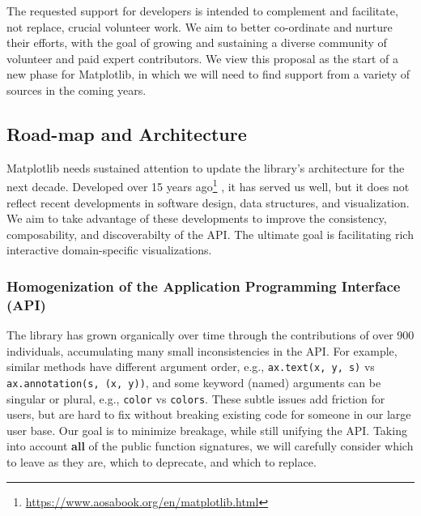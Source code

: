 \documentclass[11pt,letterpaper]{article}  %
\begin{document}
The requested support for developers is intended to complement and facilitate, not replace, crucial volunteer work. We aim to better co-ordinate and nurture their efforts, with the goal of growing and sustaining a diverse community of volunteer and paid expert contributors.
We view this proposal as the start of a new phase for Matplotlib, in which we will need to find support from a variety of sources in the coming years.



\subsection{Road-map and Architecture}
Matplotlib needs sustained attention to update the library's architecture for the next decade.
Developed over 15 years ago\footnote{\url{https://www.aosabook.org/en/matplotlib.html}} \cite{Hunter:2007}, it has served us well, but it does not reflect recent developments in software design, data structures, and visualization. We aim to take advantage of these developments to improve the consistency, composability, and discoverabilty of the API. The ultimate goal is facilitating rich interactive domain-specific visualizations.



\subsubsection{Homogenization of the Application Programming Interface (API)}
\label{sec:api_hom}
The library has grown organically over time through the contributions of over 900 individuals, accumulating many small inconsistencies in the API. For example, similar methods have different
argument order, e.g., \texttt{ax.text(x, y, s)} vs
\texttt{ax.annotation(s, (x, y))}, and some keyword (named) arguments can be
singular or plural, e.g., \texttt{color} vs \texttt{colors}.  These
subtle issues add friction for users, but are hard to fix without
breaking existing code for someone in our large user base.  Our goal is
to minimize breakage, while still unifying the API. Taking into account
\textbf{all} of the public function signatures, we will carefully consider which to leave as
they are, which to deprecate, and which to replace.
\end{document}
